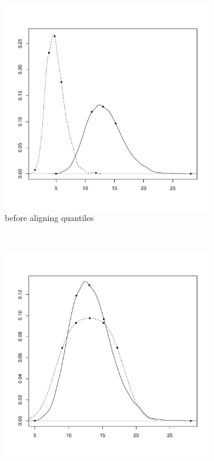 \begin{figure}[h]
\begin{subfigure}[b]{.5\textwidth}
\centering
\includegraphics[scale=.4]{figures/normalisation-quantile-a.pdf} 
\caption{before aligning quantiles}
\end{subfigure}
~
\begin{subfigure}[b]{.5\textwidth}
\centering
\includegraphics[scale=.4]{figures/normalisation-quantile-b.pdf} 

\end{subfigure}
\end{figure}
